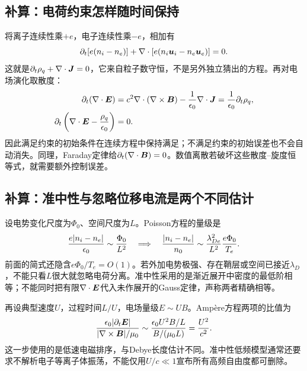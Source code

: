 \subsection{补算：电荷约束怎样随时间保持}
将离子连续性乘$+e$，电子连续性乘$-e$，相加有
\begin{equation}
 \partial_t[e(n_i-n_e)]+\nabla\cdot[e(n_i\bm{u}_i-n_e\bm{u}_e)]=0.
\end{equation}
这就是$\partial_t\rho_q+\nabla\cdot\bm{J}=0$，它来自粒子数守恒，不是另外独立猜出的方程。再对电场演化取散度：
\begin{align}
 \partial_t(\nabla\cdot\bm{E})
 &=c^2\nabla\cdot(\nabla\times\bm{B})-{1\over\epsilon_0}\nabla\cdot\bm{J}
 ={1\over\epsilon_0}\partial_t\rho_q,\\
 \partial_t\left(\nabla\cdot\bm{E}-{\rho_q\over\epsilon_0}\right)&=0.
\end{align}
因此满足约束的初始条件在连续方程中保持满足；不满足约束的初始误差也不会自动消失。同理，Faraday定律给$\partial_t(\nabla\cdot\bm{B})=0$。数值离散若破坏这些散度--旋度恒等式，就需要额外控制误差。

\subsection{补算：准中性与忽略位移电流是两个不同估计}
设电势变化尺度为$\Phi_0$、空间尺度为$L$。Poisson方程的量级是
\begin{equation}
 {e|n_i-n_e|\over\epsilon_0}\sim{\Phi_0\over L^2}
 \quad\Longrightarrow\quad
 {|n_i-n_e|\over n_0}
 \sim{\lambda_{De}^2\over L^2}{e\Phi_0\over T_e}.
\end{equation}
前面的简式还隐含$e\Phi_0/T_e=O(1)$。若外加电势极强、存在鞘层或空间已接近$\lambda_D$，不能只看$L$很大就忽略电荷分离。准中性采用的是渐近展开中密度的最低阶相等；不能同时把有限$\nabla\cdot\bm{E}$代入未作展开的Gauss定律，声称两者精确相等。

再设典型速度$U$，过程时间$L/U$，电场量级$E\sim UB$。Ampère方程两项的比值为
\begin{equation}
 {\epsilon_0|\partial_t\bm{E}|\over|\nabla\times\bm{B}|/\mu_0}
 \sim{\epsilon_0U^2B/L\over B/(\mu_0L)}
 ={U^2\over c^2}.
\end{equation}
这一步使用的是低速电磁排序，与Debye长度估计不同。准中性低频模型通常还要求不解析电子等离子体振荡，不能仅用$U/c\ll1$宣布所有高频自由度都可删除。

